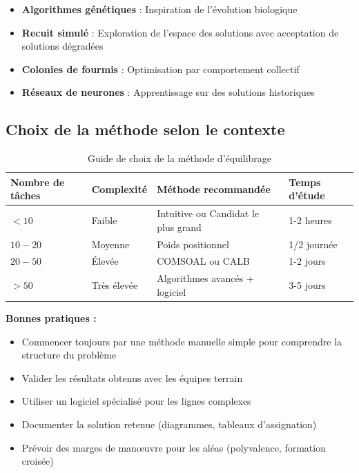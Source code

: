 \documentclass[12pt,a4paper]{article}
\newenvironment{conseil}
  {\begin{tcolorbox}[colback=green!5!white, colframe=green!50!black, title=\textbf{Conseil}]\small}
  {\end{tcolorbox}}
\begin{document}
\begin{itemize}
    \item \textbf{Algorithmes génétiques} : Inspiration de l'évolution biologique
    \item \textbf{Recuit simulé} : Exploration de l'espace des solutions avec acceptation de solutions dégradées
    \item \textbf{Colonies de fourmis} : Optimisation par comportement collectif
    \item \textbf{Réseaux de neurones} : Apprentissage sur des solutions historiques
\end{itemize}

\subsection{Choix de la méthode selon le contexte}

\begin{table}[H]
\centering
\begin{tabular}{|p{3cm}|p{3cm}|p{4cm}|p{3cm}|}
\hline
\textbf{Nombre de tâches} & \textbf{Complexité} & \textbf{Méthode recommandée} & \textbf{Temps d'étude} \\
\hline
$< 10$ & Faible & Intuitive ou Candidat le plus grand & 1-2 heures \\
\hline
$10 - 20$ & Moyenne & Poids positionnel & 1/2 journée \\
\hline
$20 - 50$ & Élevée & COMSOAL ou CALB & 1-2 jours \\
\hline
$> 50$ & Très élevée & Algorithmes avancés + logiciel & 3-5 jours \\
\hline
\end{tabular}
\caption{Guide de choix de la méthode d'équilibrage}
\end{table}

\begin{conseil}
\textbf{Bonnes pratiques :}
\begin{itemize}
    \item Commencer toujours par une méthode manuelle simple pour comprendre la structure du problème
    \item Valider les résultats obtenus avec les équipes terrain
    \item Utiliser un logiciel spécialisé pour les lignes complexes
    \item Documenter la solution retenue (diagrammes, tableaux d'assignation)
    \item Prévoir des marges de manœuvre pour les aléas (polyvalence, formation croisée)
\end{itemize}
\end{conseil}
\end{document}
